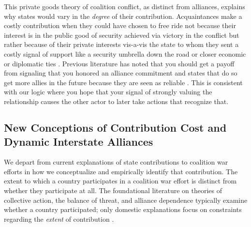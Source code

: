 \documentclass[12pt,letterpaper]{article}
\begin{document}
	This private goods theory of coalition conflict, as distinct from alliances, explains why states would vary in the \textit{degree} of their contribution. Acquaintances make a costly contribution when they could have chosen to free ride not because their interest is in the public good of security achieved via victory in the conflict but rather because of their private interests vis-a-vis the state to whom they sent a costly signal of support like a security umbrella down the road or closer economic or diplomatic ties \citep{long_defensepactsinternational_2003}. Previous literature has noted that you should get a payoff from signaling that you honored an alliance commitment and states that do so get more allies in the future because they are seen as reliable \citep[427-428]{gibler_costsrenegingreputation_2008}. This is consistent with our logic where you hope that your signal of strongly valuing the relationship causes the other actor to later take actions that recognize that.

	
	\subsection{New Conceptions of Contribution Cost and Dynamic Interstate Alliances}
		We depart from current explanations of state contributions to coalition war efforts in how we conceptualize and empirically identify that contribution. The extent to which a country participates in a coalition war effort is distinct from whether they participate at all. The foundational literature on theories of collective action, the balance of threat, and alliance dependence typically examine whether a country participated; only domestic explanations focus on constraints regarding the \textit{extent} of contribution \citep{bennett_burdensharingpersiangulf_1994, bogers_missionafghanistanwho_2013, mello_pathscoalitiondefection_2020}.
\end{document}
